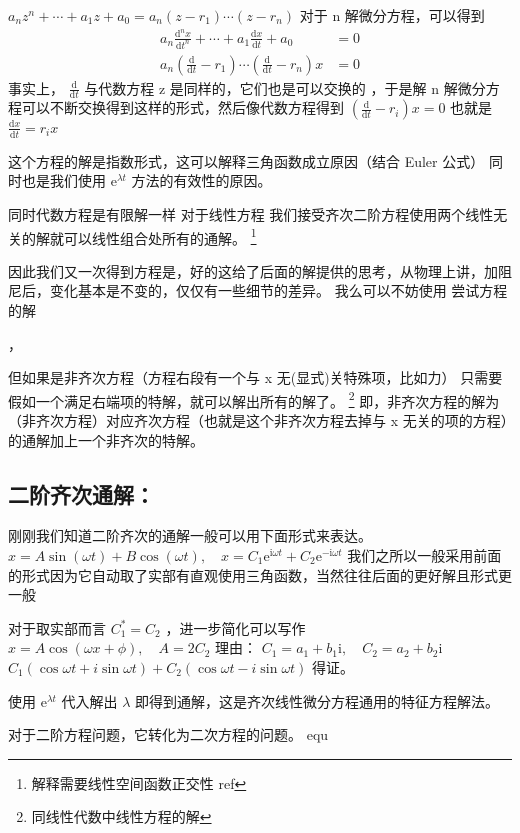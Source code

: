 \documentclass[11pt]{book}
\begin{document}
\(a_nz^n+\cdots+a_1z+a_0=a_n(z-r_1)\cdots(z-r_n)\)
对于 n 解微分方程，可以得到
\begin{align}
\label{eq:41}
a_n \frac{\mathrm{d}^nx}{\mathrm{d}t^n}+\cdots+a_1 \frac{\mathrm{d}x}{\mathrm{d}t}+a_0&=0\\
a_n(\frac{\mathrm{d}}{\mathrm{d}t}-r_1)\cdots(\frac{\mathrm{d}}{\mathrm{d}t}-r_n)x &= 0
\end{align}
事实上， \(\frac{\mathrm{d}}{\mathrm{d}t}\) 与代数方程 z 是同样的，它们也是可以交换的
，于是解 n 解微分方程可以不断交换得到这样的形式，然后像代数方程得到 \((\frac{\mathrm{d}}{\mathrm{d}t}-r_i)x=0\)
也就是 \(\frac{\mathrm{d}x}{\mathrm{d}t}=r_ix\)

这个方程的解是指数形式，这可以解释三角函数成立原因（结合 Euler 公式）
同时也是我们使用 \(\mathrm{e}^{\lambda t}\) 方法的有效性的原因。

同时代数方程是有限解一样
对于线性方程
我们接受齐次二阶方程使用两个线性无关的解就可以线性组合处所有的通解。
\footnote{解释需要线性空间函数正交性 ref }

因此我们又一次得到方程是，好的这给了后面的解提供的思考，从物理上讲，加阻尼后，变化基本是不变的，仅仅有一些细节的差异。
我么可以不妨使用
尝试方程的解

，

但如果是非齐次方程（方程右段有一个与 x 无(显式)关特殊项，比如力）
只需要假如一个满足右端项的特解，就可以解出所有的解了。
\footnote{同线性代数中线性方程的解}
即，非齐次方程的解为（非齐次方程）对应齐次方程（也就是这个非齐次方程去掉与 x 无关的项的方程）的通解加上一个非齐次的特解。

\subsection{二阶齐次通解：}
\label{sec:org9d8d3c4}
刚刚我们知道二阶齐次的通解一般可以用下面形式来表达。
\(x=A\sin(\omega t)+B\cos(\omega t),\quad x=C_1\mathrm{e}^{\mathrm{i}\omega t}+C_2\mathrm{e}^{-\mathrm{i}\omega t}\)
我们之所以一般采用前面的形式因为它自动取了实部有直观使用三角函数，当然往往后面的更好解且形式更一般

对于取实部而言 \(C_1^{*}=C_2\) ，进一步简化可以写作 \(x=A\cos (\omega x+\phi),\quad A=2C_2\)
理由：
\(C_1=a_1+b_1 \mathrm{i},\quad C_2=a_2+b_2 \mathrm{i}\)
\(C_1(\cos \omega t+i\sin \omega t)+C_2(\cos \omega t-i\sin \omega t)\)
得证。

使用 \(\mathrm{e}^{\lambda t}\) 代入解出 \(\lambda\) 即得到通解，这是齐次线性微分方程通用的特征方程解法。

对于二阶方程问题，它转化为二次方程的问题。
equ
\end{document}
